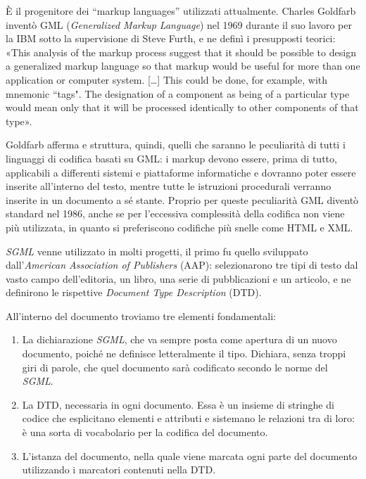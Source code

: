 \documentclass[
  b5paper,
  twoside,
  12pt,
  chapterprefix=false,
  bibliography=totocnumbered,
  parskip=false]{scrbook}
\begin{document}
È il progenitore dei \enquote{markup languages} utilizzati attualmente. Charles
Goldfarb inventò GML (\emph{Generalized Markup Language}) nel 1969 durante il
suo lavoro per la IBM sotto la supervisione di Steve Furth, e ne definì
i presupposti teorici: «This analysis of the markup process suggest that
it should be possible to design a generalized markup language so that
markup would be useful for more than one application or computer system.
{[}\ldots{]} This could be done, for example, with mnemonic ``tags". The
designation of a component as being of a particular type would mean only
that it will be processed identically to other components of that type».

Goldfarb afferma e struttura, quindi, quelli che saranno le peculiarità
di tutti i linguaggi di codifica basati su GML: i markup devono essere,
prima di tutto, applicabili a differenti sistemi e piattaforme
informatiche e dovranno poter essere inserite all'interno del testo,
mentre tutte le istruzioni procedurali verranno inserite in un documento
a sé stante. Proprio per queste peculiarità GML diventò standard nel
1986, anche se per l'eccessiva complessità della codifica non viene più
utilizzata, in quanto si preferiscono codifiche più snelle come HTML e
XML.

\emph{SGML} venne utilizzato in molti progetti, il primo fu quello sviluppato
dall'\emph{American Association of Publishers} (AAP): selezionarono tre tipi
di testo dal vasto campo dell'editoria, un libro, una serie di
pubblicazioni e un articolo, e ne definirono le rispettive \emph{Document
Type Description} (DTD).

All'interno del documento troviamo tre elementi fondamentali:

\begin{enumerate}
\def\labelenumi{\arabic{enumi}.}
\item
  La dichiarazione \emph{SGML}, che va sempre posta come apertura di un
  nuovo documento, poiché ne definisce letteralmente il tipo.
  Dichiara, senza troppi giri di parole, che quel documento sarà
  codificato secondo le norme del \emph{SGML}.
\item
  La DTD, necessaria in ogni documento. Essa è un insieme di stringhe
  di codice che esplicitano elementi e attributi e sistemano le
  relazioni tra di loro: è una sorta di vocabolario per la codifica
  del documento.
\item
  L'istanza del documento, nella quale viene marcata ogni parte del
  documento utilizzando i marcatori contenuti nella DTD.
\end{enumerate}
\end{document}
